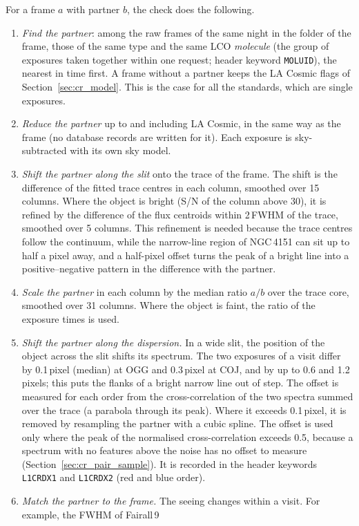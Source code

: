 For a frame $a$ with partner $b$, the check does the following.
\begin{enumerate}
\item \textit{Find the partner}: among the raw frames of the same night in the folder of the frame, those of the same
type and the same LCO \textit{molecule} (the group of exposures taken together within one request; header keyword
\texttt{MOLUID}), the nearest in time first. A frame without a partner keeps the LA Cosmic flags of
Section~\ref{sec:cr_model}. This is the case for all the standards, which are single exposures.
\item \textit{Reduce the partner} up to and including LA Cosmic, in the same way as the frame (no database records are
written for it). Each exposure is sky-subtracted with its own sky model.
\item \textit{Shift the partner along the slit} onto the trace of the frame. The shift is the difference of the fitted
trace centres in each column, smoothed over 15 columns. Where the object is bright (S/N of the column above 30), it is
refined by the difference of the flux centroids within 2\,FWHM of the trace, smoothed over 5 columns. This refinement
is needed because the trace centres follow the continuum, while the narrow-line region of NGC\,4151 can sit up to half a
pixel away, and a half-pixel offset turns the peak of a bright line into a positive--negative pattern in the difference
with the partner.
\item \textit{Scale the partner} in each column by the median ratio $a/b$ over the trace core, smoothed over 31
columns. Where the object is faint, the ratio of the exposure times is used.
\item \textit{Shift the partner along the dispersion.} In a wide slit, the position of the object across the slit
shifts its spectrum. The two exposures of a visit differ by 0.1\,pixel (median) at OGG and 0.3\,pixel at COJ, and by up
to 0.6 and 1.2\,pixels; this puts the flanks of a bright narrow line out of step. The offset is measured for each order
from the cross-correlation of the two spectra summed over the trace (a parabola through its peak). Where it exceeds
0.1\,pixel, it is removed by resampling the partner with a cubic spline. The offset is used only where the peak of the
normalised cross-correlation exceeds 0.5, because a spectrum with no features above the noise has no offset to measure
(Section~\ref{sec:cr_pair_sample}). It is recorded in the header keywords \texttt{L1CRDX1} and \texttt{L1CRDX2} (red
and blue order).
\item \textit{Match the partner to the frame.} The seeing changes within a visit. For example, the FWHM of Fairall\,9

\end{enumerate}
